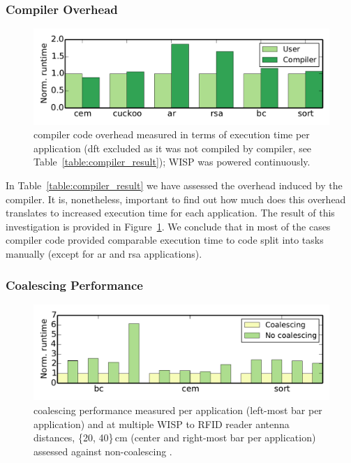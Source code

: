 \subsubsection{\sys Compiler Overhead}
\label{sec:result_compiler_time}

\begin{figure}
	\centering
	\includegraphics[width=\columnwidth]{figures/comp_user}
	\caption{\sys compiler code overhead measured in terms of execution time per application (dft excluded as it was not compiled by \sys compiler, see Table~\ref{table:compiler_result}); WISP was powered continuously.}
	\label{fig:comp_user}
\end{figure}

In Table~\ref{table:compiler_result} we have assessed the overhead induced by the \sys compiler. It is, nonetheless, important to find out how much does this overhead translates to increased execution time for each \sys application. The result of this investigation is provided in Figure~\ref{fig:comp_user}. We conclude that in most of the cases \sys compiler code provided comparable execution time to code split into tasks manually (except for ar and rsa applications). 

\subsubsection{\sys Coalescing Performance}
\label{sec:result_compiler_time}

\begin{figure}
	\centering
	\includegraphics[width=\columnwidth]{figures/coalescing}
	\caption{\sys coalescing performance measured per application (left-most bar per application) and at multiple WISP to RFID reader antenna distances, \{20, 40\}\,cm (center and right-most bar per application) assessed against non-coalescing \sys.}
	\label{fig:coalescing}
\end{figure}

